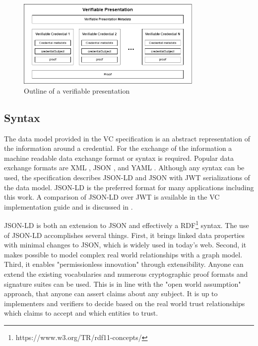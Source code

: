 \begin{figure}[htbp]
  \centering
  \includegraphics[width=0.8\textwidth]{figures/presentation.png}
  \caption{Outline of a verifiable presentation} \label{fig:presentation}
\end{figure}

\subsection{Syntax}

The data model provided in the \acrshort{VC} specification is an abstract representation of the information around a credential. For the exchange of the information a machine readable data exchange format or syntax is required. Popular data exchange formats are XML \parencite{xmlRFC}, \acrshort{JSON} \parencite{jsonRFC}, and \acrshort{YAML} \parencite{yaml}. Although any syntax can be used, the specification describes \acrfull{JSON-LD} \parencite{jsonld} and \acrshort{JSON} with \acrshort{JWT} \parencite{rfc7519} serializations of the data model. \acrshort{JSON-LD} is the preferred format for many applications including this work. A comparison of \acrshort{JSON-LD} over \acrshort{JWT} is available in the \acrshort{VC} implementation guide \parencite{chadwick_longley_sporny_terbu_zagidulin_zundel_2019} and is discussed in \cite{young_2021}. 

\acrshort{JSON-LD} is both an extension to \acrshort{JSON} and effectively a \acrfull{RDF}\footnote{https://www.w3.org/TR/rdf11-concepts/} syntax. The use of \acrshort{JSON-LD} accomplishes several things. First, it  brings linked data properties with minimal changes to \acrshort{JSON}, which is widely used in today's web. Second, it makes possible to model complex real world relationships with a graph model. Third, it enables "permissionless innovation" through extensibility. Anyone can extend the existing vocabularies and numerous cryptographic proof formats and signature suites can be used. This is in line with the "open world assumption" approach, that anyone can assert claims about any subject. It is up to implementers and verifiers to decide based on the real world trust relationships which claims to accept and which entities to trust. 

